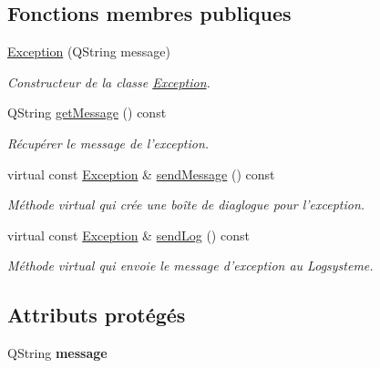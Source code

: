 \subsection*{Fonctions membres publiques}
\begin{DoxyCompactItemize}
\item 
\hyperlink{class_exception_aebfa9ca3116e897aa52160793080cc29}{Exception} (Q\-String message)
\begin{DoxyCompactList}\small\item\em Constructeur de la classe \hyperlink{class_exception}{Exception}. \end{DoxyCompactList}\item 
Q\-String \hyperlink{class_exception_a20b6402f042207e125a9b3776b3c60c6}{get\-Message} () const 
\begin{DoxyCompactList}\small\item\em Récupérer le message de l'exception. \end{DoxyCompactList}\item 
\hypertarget{class_exception_a5874c51943108fae7f792b5a80673b86}{virtual const \hyperlink{class_exception}{Exception} \& \hyperlink{class_exception_a5874c51943108fae7f792b5a80673b86}{send\-Message} () const }\label{class_exception_a5874c51943108fae7f792b5a80673b86}

\begin{DoxyCompactList}\small\item\em Méthode virtual qui crée une boîte de diaglogue pour l'exception. \end{DoxyCompactList}\item 
\hypertarget{class_exception_a1a55a11a1379f03e15323c8015fb714e}{virtual const \hyperlink{class_exception}{Exception} \& \hyperlink{class_exception_a1a55a11a1379f03e15323c8015fb714e}{send\-Log} () const }\label{class_exception_a1a55a11a1379f03e15323c8015fb714e}

\begin{DoxyCompactList}\small\item\em Méthode virtual qui envoie le message d'exception au Logsysteme. \end{DoxyCompactList}\end{DoxyCompactItemize}
\subsection*{Attributs protégés}
\begin{DoxyCompactItemize}
\item 
\hypertarget{class_exception_a0ecd6018bc7499fe883e5ccedb142e19}{Q\-String {\bfseries message}}\label{class_exception_a0ecd6018bc7499fe883e5ccedb142e19}

\end{DoxyCompactItemize}


